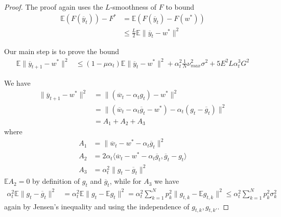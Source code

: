 \begin{proof}
	The proof again uses the $L$-smoothness of $F$ to bound 
	\begin{align*}
	\mathbb{E}(F(\overline{y}_{t}))-F^{\ast} & =\mathbb{E}(F(\overline{y}_{t})-F(w^{\ast}))\\
	& \leq\frac{L}{2}\mathbb{E}\|\overline{y}_{t}-w^{\ast}\|^{2}
	\end{align*}
	
	Our main step is to prove the bound 
	\begin{align*}
	\mathbb{E}\|\overline{y}_{t+1}-w^{\ast}\|^{2} & \leq(1-\mu\alpha_{t})\mathbb{E}\|\overline{y}_{t}-w^{\ast}\|^{2}+\alpha_{t}^{2}\frac{1}{N}\nu_{max}^{2}\sigma^{2}+5E^{2}L\alpha_{t}^{3}G^{2}
	\end{align*}
	
	We have 
	\begin{align*}
	\|\overline{y}_{t+1}-w^{\ast}\|^{2} & =\|(\overline{w}_{t}-\alpha_{t}g_{t})-w^{\ast}\|^{2}\\
	& =\|(\overline{w}_{t}-\alpha_{t}\overline{g}_{t}-w^{\ast})-\alpha_{t}(g_{t}-\overline{g}_{t})\|^{2}\\
	& =A_{1}+A_{2}+A_{3}
	\end{align*}
	where 
	\begin{align*}
	A_{1} & =\|\overline{w}_{t}-w^{\ast}-\alpha_{t}\overline{g}_{t}\|^{2}\\
	A_{2} & =2\alpha_{t}\langle\overline{w}_{t}-w^{\ast}-\alpha_{t}\overline{g}_{t},\overline{g}_{t}-g_{t}\rangle\\
	A_{3} & =\alpha_{t}^{2}\|g_{t}-\overline{g}_{t}\|^{2}
	\end{align*}
	$\mathbb{E}A_{2}=0$ by definition of $g_{t}$ and $\overline{g}_{t}$,
	while for $A_{3}$ we have
	\begin{align*}
	\alpha_{t}^{2}\mathbb{E}\|g_{t}-\overline{g}_{t}\|^{2} & =\alpha_{t}^{2}\mathbb{E}\|g_{t}-\mathbb{E}g_{t}\|^{2}=\alpha_{t}^{2}\sum_{k=1}^{N}p_{k}^{2}\|g_{t,k}-\mathbb{E}g_{t,k}\|^{2}\leq\alpha_{t}^{2}\sum_{k=1}^{N}p_{k}^{2}\sigma_{k}^{2}
	\end{align*}
	again by Jensen's inequality and using the independence of $g_{t,k},g_{t,k'}$. 
	

\end{proof}
